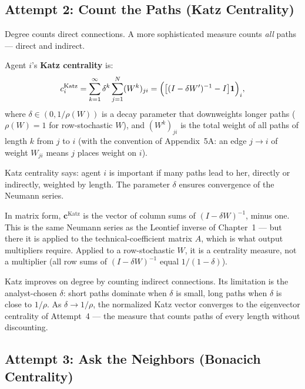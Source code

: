 \documentclass[../structural_economics_book.tex]{subfiles}
\begin{document}
\subsection{Attempt 2: Count the Paths (Katz Centrality)}

Degree counts direct connections. A more sophisticated measure counts \textit{all} paths --- direct and indirect.

\begin{definition}\label{ch06:def:katz}
Agent $i$'s \textbf{Katz centrality} is:
\begin{equation}\label{ch06:eq:katz}
c_i^{\text{Katz}} = \sum_{k=1}^{\infty} \delta^k \sum_{j=1}^N (W^k)_{ji} = \Bigl(\bigl[(I - \delta W')^{-1} - I\bigr]\mathbf{1}\Bigr)_{i},
\end{equation}
where $\delta \in (0, 1/\rho(W))$ is a decay parameter that downweights longer paths ($\rho(W) = 1$ for row-stochastic $W$), and $(W^k)_{ji}$ is the total weight of all paths of length $k$ from $j$ to $i$ (with the convention of Appendix~5A: an edge $j \to i$ of weight $W_{ji}$ means $j$ places weight on $i$).
\end{definition}

Katz centrality says: agent $i$ is important if many paths lead to her, directly or indirectly, weighted by length. The parameter $\delta$ ensures convergence of the Neumann series.

\begin{intuition}
In matrix form, $\mathbf{c}^{\text{Katz}}$ is the vector of column sums of $(I - \delta W)^{-1}$, minus one. This is the same Neumann series as the Leontief inverse of Chapter~1 --- but there it is applied to the technical-coefficient matrix $A$, which is what output multipliers require. Applied to a row-stochastic $W$, it is a centrality measure, not a multiplier (all row sums of $(I-\delta W)^{-1}$ equal $1/(1-\delta)$).

Katz improves on degree by counting indirect connections. Its limitation is the analyst-chosen $\delta$: short paths dominate when $\delta$ is small, long paths when $\delta$ is close to $1/\rho$. As $\delta \to 1/\rho$, the normalized Katz vector converges to the eigenvector centrality of Attempt~4 --- the measure that counts paths of every length without discounting.
\end{intuition}


\subsection{Attempt 3: Ask the Neighbors (Bonacich Centrality)}
\end{document}
